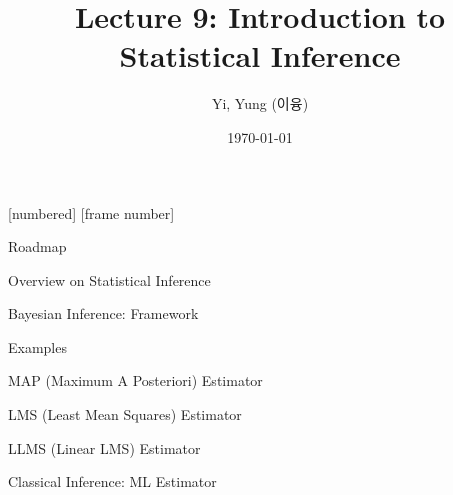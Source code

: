 

\csname\pdfmode\endcsname

{
  [numbered]
  [frame number]  %
}



\title[]{Lecture 9: Introduction to Statistical Inference}
\author{Yi, Yung (이융)}
\date{\today}








\begin{frame}
  \titlepage
\end{frame}





\begin{frame}{Roadmap}

\plitemsep 0.15in

\bce[(1)]

\item Overview on Statistical Inference

\item Bayesian Inference: Framework

\item Examples

\item MAP (Maximum A Posteriori) Estimator

\item LMS (Least Mean Squares) Estimator

\item LLMS (Linear LMS) Estimator

\item Classical Inference: ML Estimator



  
  \ece

\end{frame}

